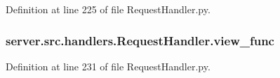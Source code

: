 Definition at line 225 of file Request\+Handler.\+py.

\subsubsection[{\texorpdfstring{view\+\_\+func}{view_func}}]{\setlength{\rightskip}{0pt plus 5cm}server.\+src.\+handlers.\+Request\+Handler.\+view\+\_\+func}\hypertarget{namespaceserver_1_1src_1_1handlers_1_1_request_handler_ab19dac7adef180b08d60d44162def139}{}\label{namespaceserver_1_1src_1_1handlers_1_1_request_handler_ab19dac7adef180b08d60d44162def139}


Definition at line 231 of file Request\+Handler.\+py.

